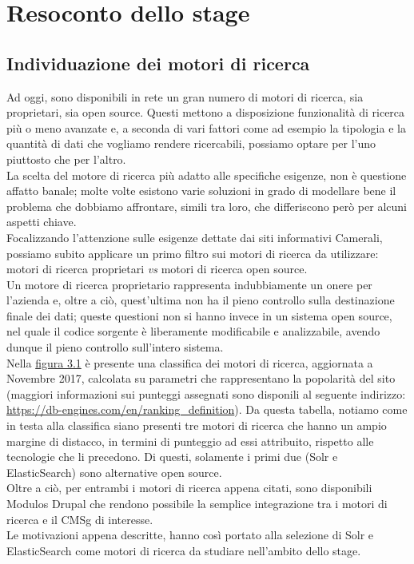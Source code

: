 

\chapter{Resoconto dello stage}
\label{cap:resoconto_dello_stage}

	\section{Individuazione dei motori di ricerca}
	Ad oggi, sono disponibili in rete un gran numero di motori di ricerca, sia proprietari, sia \gls{open source}. Questi mettono a disposizione funzionalità di ricerca più o meno avanzate e, a seconda di vari fattori come ad esempio la tipologia e la quantità di dati che vogliamo rendere ricercabili, possiamo optare per l'uno piuttosto che per l'altro. \\
	La scelta del motore di ricerca più adatto alle specifiche esigenze, non è questione affatto banale; molte volte esistono varie soluzioni in grado di modellare bene il problema che dobbiamo affrontare, simili tra loro, che differiscono però per alcuni aspetti chiave. \\
	Focalizzando l'attenzione sulle esigenze dettate dai siti informativi Camerali, possiamo subito applicare un primo filtro sui motori di ricerca da utilizzare: motori di ricerca proprietari \textit{vs} motori di ricerca \gls{open source}. \\
	Un motore di ricerca proprietario rappresenta indubbiamente un onere per l'azienda e, oltre a ciò, quest'ultima non ha il pieno controllo sulla destinazione finale dei dati; queste questioni non si hanno invece in un sistema \gls{open source}, nel quale il codice sorgente è liberamente modificabile e analizzabile, avendo dunque il pieno controllo sull'intero sistema. \\
	Nella \hyperref[img:confronto_SE]{figura 3.1} è presente una classifica dei motori di ricerca, aggiornata a Novembre 2017, calcolata su parametri che rappresentano la popolarità del sito (maggiori informazioni sui punteggi assegnati sono disponili al seguente indirizzo: \url{https://db-engines.com/en/ranking_definition}). Da questa tabella, notiamo come in testa alla classifica siano presenti tre motori di ricerca che hanno un ampio margine di distacco, in termini di punteggio ad essi attribuito, rispetto alle tecnologie che li precedono. Di questi, solamente i primi due (\gls{Solr} e \gls{ElasticSearch}) sono alternative \gls{open source}. \\
	Oltre a ciò, per entrambi i motori di ricerca appena citati, sono disponibili \glspl{Modulo} \gls{Drupal} che rendono possibile la semplice integrazione tra i motori di ricerca e il \gls{CMSg} di interesse. \\
	Le motivazioni appena descritte, hanno così portato alla selezione di \gls{Solr} e \gls{ElasticSearch} come motori di ricerca da studiare nell'ambito dello stage.

